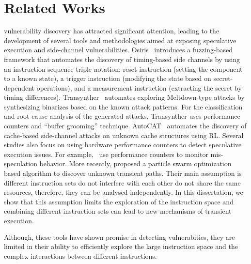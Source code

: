\section{Related Works}

\Mi vulnerability discovery has attracted significant attention, leading to the development of several tools and methodologies aimed at exposing speculative execution and side-channel vulnerabilities. 
%
Osiris~\cite{weber2021osiris} introduces a fuzzing-based framework that automates the discovery of timing-based \Mi side channels by using an instruction-sequence triple notation: reset instruction (setting the \Mi component to a known state), a trigger instruction (modifying the state based on secret-dependent operations), and a measurement instruction (extracting the secret by timing differences).
%
Transynther~\cite{moghimi2020medusa, moghimi2023downfall} automates exploring Meltdown-type attacks by synthesizing binarizes based on the known attack patterns. For the classification and root cause analysis of the generated attacks, Transynther uses performance counters and \Mi ``buffer grooming'' technique.
%
AutoCAT~\cite{luo2022autocat} automates the discovery of cache-based side-channel attacks on unknown cache structures using RL.
%
Several studies also focus on using hardware performance counters to detect speculative execution issues. For example,~\cite{ragab2021rage, oleksenko2023hide} use performance counters to monitor mis-speculation behavior. 
%
More recently, \cite{chakraborty2024shesha} proposed a particle swarm optimization based algorithm to discover unknown transient paths. Their main assumption is different instruction sets do not interfere with each other do not share the same resources, therefore, they can be analysed independently. In this dissertation, we show that this assumption limits the exploration of the instruction space and combining different instruction sets can lead to new mechanisms of transient execution.

Although, these tools have shown promise in detecting \Mi vulnerabities, they are limited in their ability to efficiently explore the large instruction space and the complex interactions between different instructions.
